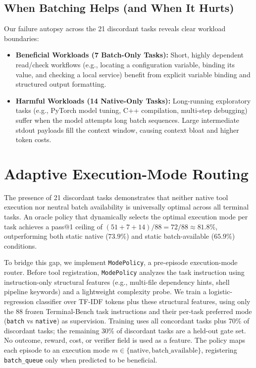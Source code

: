\documentclass{article}
\begin{document}
\subsection{When Batching Helps (and When It Hurts)}

Our failure autopsy across the 21 discordant tasks reveals clear workload boundaries:
\begin{itemize}
    \item \textbf{Beneficial Workloads (7 Batch-Only Tasks):} Short, highly dependent read/check workflows (e.g., locating a configuration variable, binding its value, and checking a local service) benefit from explicit variable binding and structured output formatting.
    \item \textbf{Harmful Workloads (14 Native-Only Tasks):} Long-running exploratory tasks (e.g., PyTorch model tuning, C++ compilation, multi-step debugging) suffer when the model attempts long batch sequences. Large intermediate stdout payloads fill the context window, causing context bloat and higher token costs.
\end{itemize}

\section{Adaptive Execution-Mode Routing}

The presence of 21 discordant tasks demonstrates that neither native tool execution nor neutral batch availability is universally optimal across all terminal tasks. An oracle policy that dynamically selects the optimal execution mode per task achieves a pass@1 ceiling of $(51 + 7 + 14) / 88 = 72/88 \approx 81.8\%$, outperforming both static native ($73.9\%$) and static batch-available ($65.9\%$) conditions.

To bridge this gap, we implement \texttt{ModePolicy}, a pre-episode execution-mode router. Before tool registration, \texttt{ModePolicy} analyzes the task instruction using instruction-only structural features (e.g., multi-file dependency hints, shell pipeline keywords) and a lightweight complexity probe. We train a logistic-regression classifier over TF-IDF tokens plus these structural features, using only the 88 frozen Terminal-Bench task instructions and their per-task preferred mode (\texttt{batch} vs \texttt{native}) as supervision. Training uses all concordant tasks plus 70\% of discordant tasks; the remaining 30\% of discordant tasks are a held-out gate set. No outcome, reward, cost, or verifier field is used as a feature. The policy maps each episode to an execution mode $m \in \{\text{native}, \text{batch\_available}\}$, registering \texttt{batch\_queue} only when predicted to be beneficial.
\end{document}
